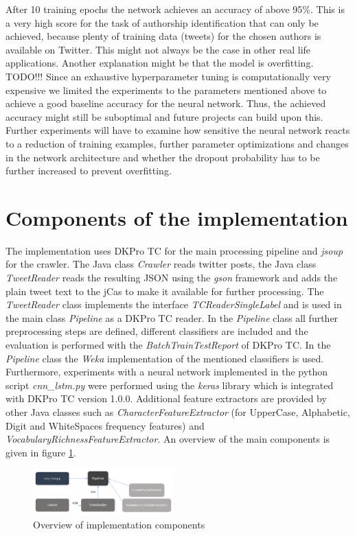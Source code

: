 \documentclass[journal, a4paper, 12pt]{IEEEtran}
\begin{document}
After 10 training epochs the network achieves an accuracy of above 95\%. This is a very high score for the task of authorship identification that can only be achieved, because plenty of training data (tweets) for the chosen authors is available on Twitter. This might not always be the case in other real life applications. Another explanation might be that the model is overfitting. TODO!!! Since an exhaustive hyperparameter tuning is computationally very expensive we limited the experiments to the parameters mentioned above to achieve a good baseline accuracy for the neural network. Thus, the achieved accuracy might still be suboptimal and future projects can build upon this. Further experiments will have to examine how sensitive the neural network reacts to a reduction of training examples, further parameter optimizations and changes in the network architecture and whether the dropout probability has to be further increased to prevent overfitting.

\section{Components of the implementation}
The implementation uses DKPro TC for the main processing pipeline and \textit{jsoup} for the crawler. The Java class \textit{Crawler} reads twitter posts, the Java class \textit{TweetReader} reads the resulting JSON using the \textit{gson} framework and adds the plain tweet text to the jCas to make it available for further processing. The \textit{TweetReader} class implements the interface \textit{TCReaderSingleLabel} and is used in the main class \textit{Pipeline} as a DKPro TC reader. In the \textit{Pipeline} class all further preprocessing steps are defined, different classifiers are included and the evaluation is performed with the \textit{BatchTrainTestReport} of DKPro TC. In the \textit{Pipeline} class the \textit{Weka} implementation of the mentioned classifiers is used. Furthermore, experiments with a neural network implemented in the python script \textit{cnn\_lstm.py} were performed using the \textit{keras} library which is integrated with DKPro TC version 1.0.0. Additional feature extractors are provided by other Java classes such as \textit{CharacterFeatureExtractor} (for UpperCase, Alphabetic, Digit and WhiteSpaces frequency features) and \textit{VocabularyRichnessFeatureExtractor}. An overview of the main components is given in figure \ref{fig:components}.
\begin{figure}[h]
	\caption{Overview of implementation components}
	\label{fig:components}
	\centering
	\vspace{5mm}
	\includegraphics[width=0.48\textwidth]{components.PNG}
\end{figure}
\end{document}
